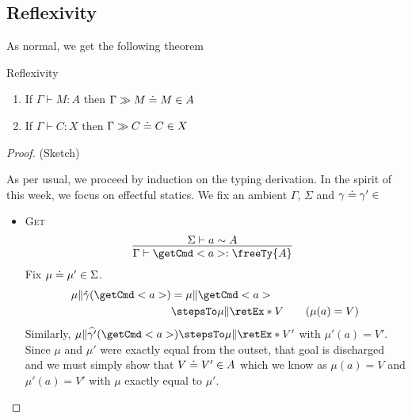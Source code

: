 \documentclass[letterpaper]{article}
\begin{document}
\subsection{Reflexivity}
As normal, we get the following theorem
\begin{theorem} Reflexivity

    \begin{enumerate}
        \item If $\Gamma \vdash M : A$ then $\Gamma \gg M\mathrel{\doteq}M \in A$
        \item If $\Gamma \vdash C : X$ then $\Gamma \gg C\mathrel{\doteq}C \in X$
    \end{enumerate}
\end{theorem}
\begin{proof} (Sketch)

    As per usual, we proceed by induction on the typing derivation. In the spirit of this week, we focus on effectful statics. We fix an ambient $\Gamma$, $\Sigma$ and $\exEqOf{\gamma}{\gamma'}$
    \begin{itemize}
        \item[] \textsc{Get}
        \[
            \infer[]{\Gamma \vdash \getCmd<a> : \freeTy{A} }{\Sigma \vdash a \sim A}
        \]
        Fix $\mu\mathrel{\doteq}\mu' \in \Sigma$.
        \begin{align*}
            \mu \Vert \hat{\gamma}(\getCmd<a>)
            &= \mu \Vert \getCmd<a>\\
            &\stepsTo \mu \Vert \retEx*{V} \tag{$\mu(a) = V$}
        \end{align*}
        Similarly, $\mu \Vert \widehat{\gamma'}(\getCmd<a>) \stepsTo \mu \Vert \retEx*{V'}$ with $\mu'(a) = V'$. Since $\mu$ and $\mu'$ were exactly equal from the outset, that goal is discharged and we must simply show that $V\mathrel{\doteq}V' \in A$ which we know as $\mu(a) = V$ and $\mu'(a) = V'$ with $\mu$ exactly equal to $\mu'$.


\end{itemize}
\end{proof}
\end{document}
